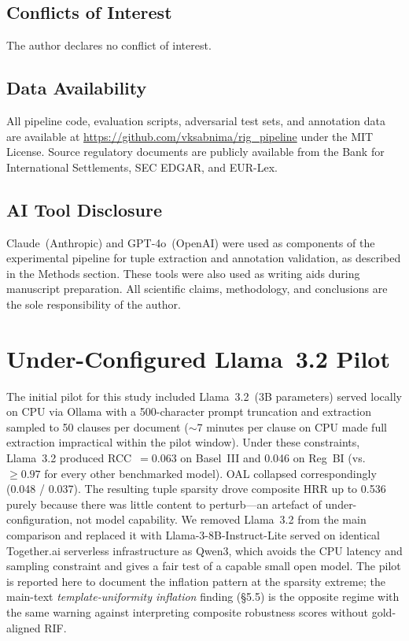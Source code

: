 \documentclass{article}
\begin{document}
\subsection*{Conflicts of Interest}
The author declares no conflict of interest.

\subsection*{Data Availability}
All pipeline code, evaluation scripts, adversarial test sets, and
annotation data are available at
\url{https://github.com/vksabnima/rig_pipeline} under the MIT License.
Source regulatory documents are publicly available from the Bank for
International Settlements, SEC EDGAR, and EUR-Lex.

\subsection*{AI Tool Disclosure}
Claude~(Anthropic) and GPT-4o~(OpenAI) were used as components of the
experimental pipeline for tuple extraction and annotation validation,
as described in the Methods section.
These tools were also used as writing aids during manuscript preparation.
All scientific claims, methodology, and conclusions are the sole
responsibility of the author.

\appendix

\section{Under-Configured Llama~3.2 Pilot}
\label{app:llama32}

The initial pilot for this study included Llama~3.2~(3B parameters)
served locally on CPU via Ollama with a 500-character prompt
truncation and extraction sampled to 50 clauses per document
($\sim$7 minutes per clause on CPU made full extraction
impractical within the pilot window). Under these constraints,
Llama~3.2 produced RCC~$= 0.063$ on Basel~III and 0.046 on Reg~BI
(vs.\ $\geq 0.97$ for every other benchmarked model). OAL collapsed
correspondingly (0.048 / 0.037). The resulting tuple sparsity drove
composite HRR up to 0.536 purely because there was little content to
perturb---an artefact of under-configuration, not model capability.
We removed Llama~3.2 from the main comparison and replaced it with
Llama-3-8B-Instruct-Lite served on identical Together.ai serverless
infrastructure as Qwen3, which avoids the CPU latency and sampling
constraint and gives a fair test of a capable small open model.
The pilot is reported here to document the inflation pattern at the
sparsity extreme; the main-text \emph{template-uniformity inflation}
finding (§5.5) is the opposite regime with the same warning against
interpreting composite robustness scores without gold-aligned RIF.

\printbibliography
\end{document}

